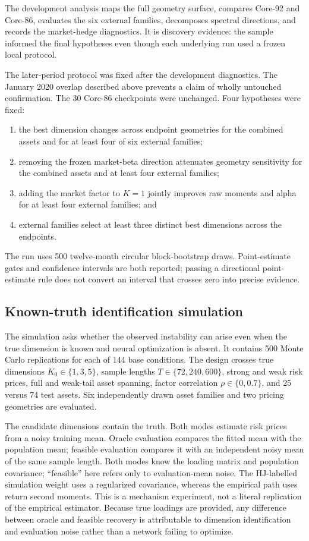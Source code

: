 The development analysis maps the full geometry surface, compares Core-92 and Core-86, evaluates the six external families, decomposes spectral directions, and records the market-hedge diagnostics. It is discovery evidence: the sample informed the final hypotheses even though each underlying run used a frozen local protocol.

The later-period protocol was fixed after the development diagnostics. The January 2020 overlap described above prevents a claim of wholly untouched confirmation. The 30 Core-86 checkpoints were unchanged. Four hypotheses were fixed:
\begin{enumerate}
 \item the best dimension changes across endpoint geometries for the combined assets and for at least four of six external families;
 \item removing the frozen market-beta direction attenuates geometry sensitivity for the combined assets and at least four external families;
 \item adding the market factor to $K=1$ jointly improves raw moments and alpha for at least four external families; and
 \item external families select at least three distinct best dimensions across the endpoints.
\end{enumerate}
The run uses 500 twelve-month circular block-bootstrap draws. Point-estimate gates and confidence intervals are both reported; passing a directional point-estimate rule does not convert an interval that crosses zero into precise evidence.

\subsection{Known-truth identification simulation}

The simulation asks whether the observed instability can arise even when the true dimension is known and neural optimization is absent. It contains 500 Monte Carlo replications for each of 144 base conditions. The design crosses true dimensions $K_0\in\{1,3,5\}$, sample lengths $T\in\{72,240,600\}$, strong and weak risk prices, full and weak-tail asset spanning, factor correlation $\rho\in\{0,0.7\}$, and 25 versus 74 test assets. Six independently drawn asset families and two pricing geometries are evaluated.

The candidate dimensions contain the truth. Both modes estimate risk prices from a noisy training mean. Oracle evaluation compares the fitted mean with the population mean; feasible evaluation compares it with an independent noisy mean of the same sample length. Both modes know the loading matrix and population covariance; ``feasible'' here refers only to evaluation-mean noise. The HJ-labelled simulation weight uses a regularized covariance, whereas the empirical path uses return second moments. This is a mechanism experiment, not a literal replication of the empirical estimator. Because true loadings are provided, any difference between oracle and feasible recovery is attributable to dimension identification and evaluation noise rather than a network failing to optimize.

